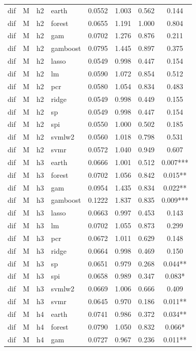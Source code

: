 \begin{ThreePartTable}
\begin{longtable}[t]{llclcccc}
dif & M & h2 & earth & 0.0552 & 1.003 & 0.562 & 0.144\\
dif & M & h2 & forest & 0.0655 & 1.191 & 1.000 & 0.804\\
dif & M & h2 & gam & 0.0702 & 1.276 & 0.876 & 0.211\\
dif & M & h2 & gamboost & 0.0795 & 1.445 & 0.897 & 0.375\\
dif & M & h2 & lasso & 0.0549 & 0.998 & 0.447 & 0.154\\
dif & M & h2 & lm & 0.0590 & 1.072 & 0.854 & 0.512\\
dif & M & h2 & pcr & 0.0580 & 1.054 & 0.834 & 0.483\\
dif & M & h2 & ridge & 0.0549 & 0.998 & 0.449 & 0.155\\
dif & M & h2 & sp & 0.0549 & 0.998 & 0.447 & 0.154\\
dif & M & h2 & spi & 0.0550 & 1.000 & 0.502 & 0.185\\
dif & M & h2 & svmlw2 & 0.0560 & 1.018 & 0.798 & 0.531\\
dif & M & h2 & svmr & 0.0572 & 1.040 & 0.949 & 0.607\\
\addlinespace
dif & M & h3 & earth & 0.0666 & 1.001 & 0.512 & 0.007***\\
dif & M & h3 & forest & 0.0702 & 1.056 & 0.842 & 0.015**\\
dif & M & h3 & gam & 0.0954 & 1.435 & 0.834 & 0.022**\\
dif & M & h3 & gamboost & 0.1222 & 1.837 & 0.835 & 0.009***\\
dif & M & h3 & lasso & 0.0663 & 0.997 & 0.453 & 0.143\\
dif & M & h3 & lm & 0.0702 & 1.055 & 0.873 & 0.299\\
dif & M & h3 & pcr & 0.0672 & 1.011 & 0.629 & 0.148\\
dif & M & h3 & ridge & 0.0664 & 0.998 & 0.469 & 0.150\\
dif & M & h3 & sp & 0.0651 & 0.979 & 0.268 & 0.044**\\
dif & M & h3 & spi & 0.0658 & 0.989 & 0.347 & 0.083*\\
dif & M & h3 & svmlw2 & 0.0669 & 1.006 & 0.666 & 0.409\\
dif & M & h3 & svmr & 0.0645 & 0.970 & 0.186 & 0.011**\\
\addlinespace
dif & M & h4 & earth & 0.0741 & 0.986 & 0.372 & 0.034**\\
dif & M & h4 & forest & 0.0790 & 1.050 & 0.832 & 0.066*\\
dif & M & h4 & gam & 0.0727 & 0.967 & 0.236 & 0.011**\\

\end{longtable}
\end{ThreePartTable}
